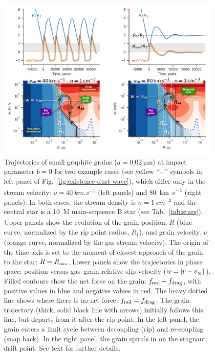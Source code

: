\begin{figure}
  \centering
  \includegraphics[width=\linewidth]{figs/dust-wave-phase-trajectories-annotate}
  \caption{Trajectories of small graphite grains
    (\(a = \SI{0.02}{\um}\)) at impact parameter \(b = 0\) for two
    example cases (see yellow ``+'' symbols in left panel of
    Fig.~\ref{fig:existence-dust-wave}), which differ only in the
    stream velocity: \(v = \SI{40}{km.s^{-1}}\) (left panels) and
    \SI{80}{km.s^{-1}} (right panels).  In both cases, the stream
    density is \(n = \SI{1}{cm^{-3}}\) and the central star is a
    \SI{10}{M_\odot} main-sequence B star (see Tab.~\ref{tab:stars}).
    Upper panels show the evolution of the grain position, \(R\) (blue
    curve, normalized by the rip point radius, \(R_\dag\)), and grain
    velocity, \(v\) (orange curve, normalized by the gas stream
    velocity).  The origin of the time axis is set to the moment of
    closest approach of the grain to the star: \(R = R_{\scriptscriptstyle\text{min}}\).  Lower
    panels show the trajectories in phase space: position versus
    gas--grain relative slip velocity (\(w = \lvert v - v_\infty\rvert\)).  Filled
    contours show the net force on the grain: \(f_{\text{rad}} - f_{\text{drag}}\), with
    positive values in blue and negative values in red.  The heavy
    dotted line shows where there is no net force: \(f_{\text{rad}} = f_{\text{drag}}\).
    The grain trajectory (thick, solid black line with arrows)
    initially follows this line, but departs from it after the rip
    point. In the left panel, the grain enters a limit cycle between
    decoupling (rip) and re-coupling (snap back).  In the right panel,
    the grain spirals in on the stagnant drift point.  See text for
    further details.}
    \label{fig:phase-space-trajectories}
\end{figure}

